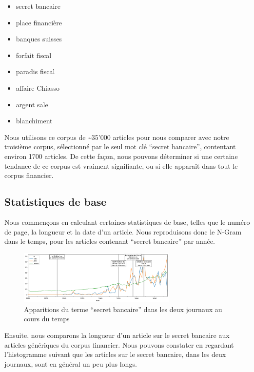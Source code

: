 \documentclass[11pt]{article}
\begin{document}
\begin{itemize}
\item
  secret bancaire
\item
  place financière
\item
  banques suisses
\item
  forfait fiscal
\item
  paradis fiscal
\item
  affaire Chiasso
\item
  argent sale
\item
  blanchiment
\end{itemize}

Nous utilisons ce corpus de \textasciitilde{}35'000 articles pour nous
comparer avec notre troisième corpus, sélectionné par le seul mot clé
``secret bancaire'', contentant environ 1700 articles. De cette façon,
nous pouvons déterminer si une certaine tendance de ce corpus est
vraiment signifiante, ou si elle apparaît dans tout le corpus financier.

\hypertarget{statistiques-de-base}{%
\subsection{Statistiques de base}\label{statistiques-de-base}}

Nous commençons en calculant certaines statistiques de base, telles que
le numéro de page, la longueur et la date d'un article. Nous
reproduisons donc le N-Gram dans le temps, pour les articles contenant
``secret bancaire'' par année.

\begin{figure}
\centering
\includegraphics[width=0.7\textwidth]{methodology/ngram_ts.png}
\caption{Apparitions du terme ``secret bancaire'' dans les deux journaux
au cours du temps}
\end{figure}

Ensuite, nous comparons la longueur d'un article sur le secret bancaire
aux articles génériques du corpus financier. Nous pouvons constater en
regardant l'histogramme suivant que les articles sur le secret bancaire,
dans les deux journaux, sont en général un peu plus longs.
\end{document}

